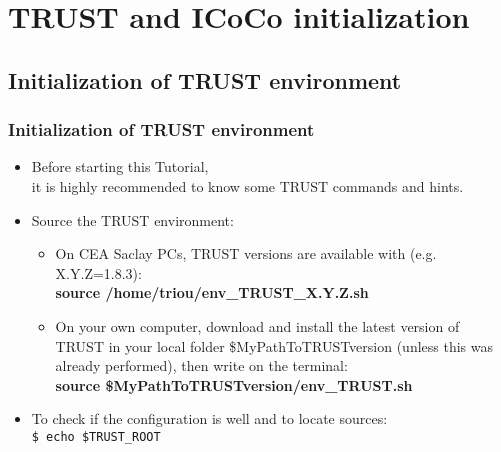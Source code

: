 \documentclass[10pt, hyperref={unicode=true,pdfusetitle, bookmarks=true,bookmarksnumbered=false,bookmarksopen=false, breaklinks=false,pdfborder={0 0 1},backref=true,colorlinks=true,linkcolor=darkblue,pageanchor, urlcolor=darkblue}]{beamer}
\begin{document}



\section{{\bf{TRUST and ICoCo initialization}}}
\begin{frame}
\end{frame}

\begin{frame}
\subsection{Initialization of TRUST environment}

\frametitle{Initialization of TRUST environment}
\begin{block}{}

\begin{itemize}
\item Before starting this Tutorial, \\
 it is highly recommended to know some TRUST commands and hints.\vspace{0.2cm}
 \item Source the TRUST environment:\\
\begin{itemize}
\item On CEA Saclay PCs, TRUST versions are available with (e.g. X.Y.Z=1.8.3):\\
\textbf{source /home/triou/env\_TRUST\_X.Y.Z.sh}
\vspace{0.2cm}
\item On your own computer, download and install the latest version of TRUST in your local folder \$MyPathToTRUSTversion (unless this was already performed), then write on the terminal:\\
\textbf{source  \$MyPathToTRUSTversion/env\_TRUST.sh}
\vspace{0.2cm}
\end{itemize}

\item To check if the configuration is well and to locate sources:\\
\texttt{\$ echo \$TRUST\_ROOT}
\end{itemize}
\end{block}
\end{frame}
\end{document}

